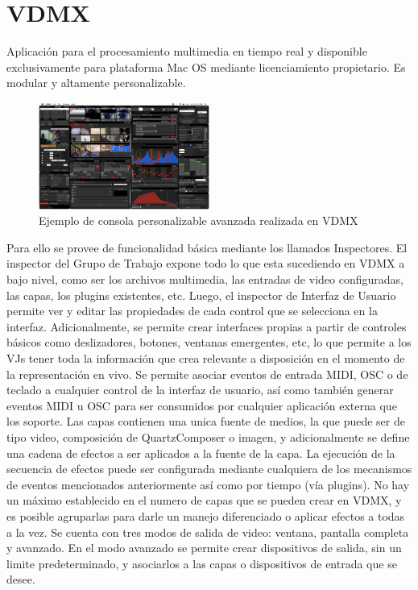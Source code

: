 \section{VDMX}
Aplicación para el procesamiento multimedia en tiempo real y disponible exclusivamente para plataforma Mac OS mediante licenciamiento propietario. Es modular y altamente personalizable.

\begin{figure}[H]
  \centering
    \includegraphics[width=0.5\textwidth]{./Cap3_aplicaciones/apps-vdmx.png}
  \caption{Ejemplo de consola personalizable avanzada realizada en VDMX\cite{VDMX}}
  \label{fig:Apps-VDMX}
\end{figure}


Para ello se provee de funcionalidad básica mediante los llamados Inspectores. El inspector del Grupo de Trabajo expone todo lo que esta sucediendo en VDMX a bajo nivel, como ser los archivos multimedia, las entradas de video configuradas, las capas, los plugins existentes, etc. Luego, el inspector de Interfaz de Usuario permite ver y editar las propiedades de cada control que se selecciona en la interfaz. Adicionalmente, se permite crear interfaces propias a partir de controles básicos como deslizadores, botones, ventanas emergentes, etc, lo que permite a los VJs tener toda la información que crea relevante a disposición en el momento de la representación en vivo.
Se permite asociar eventos de entrada MIDI, OSC o de teclado a cualquier control de la interfaz de usuario, así como también generar eventos MIDI u OSC para ser consumidos por cualquier aplicación externa que los soporte.
Las capas contienen una unica fuente de medios, la que puede ser de tipo video, composición de QuartzComposer o imagen, y adicionalmente se define una cadena de efectos a ser aplicados a la fuente de la capa. La ejecución de la secuencia de efectos puede ser configurada mediante cualquiera de los mecanismos de eventos mencionados anteriormente así como por tiempo (vía plugins). No hay un máximo establecido en el numero de capas que se pueden crear en VDMX, y es posible agruparlas para darle un manejo diferenciado o aplicar efectos a todas a la vez.
Se cuenta con tres modos de salida de video: ventana, pantalla completa y avanzado. En el modo avanzado se permite crear dispositivos de salida, sin un limite predeterminado, y asociarlos a las capas o dispositivos de entrada que se desee.
